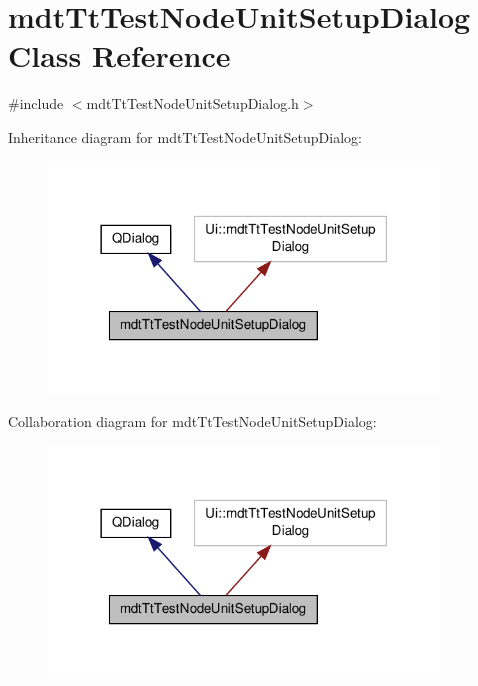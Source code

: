 \hypertarget{classmdt_tt_test_node_unit_setup_dialog}{\section{mdt\-Tt\-Test\-Node\-Unit\-Setup\-Dialog Class Reference}
\label{classmdt_tt_test_node_unit_setup_dialog}
}


{\ttfamily \#include $<$mdt\-Tt\-Test\-Node\-Unit\-Setup\-Dialog.\-h$>$}



Inheritance diagram for mdt\-Tt\-Test\-Node\-Unit\-Setup\-Dialog\-:\nopagebreak
\begin{figure}[H]
\begin{center}
\leavevmode
\includegraphics[width=294pt]{classmdt_tt_test_node_unit_setup_dialog__inherit__graph}
\end{center}
\end{figure}


Collaboration diagram for mdt\-Tt\-Test\-Node\-Unit\-Setup\-Dialog\-:\nopagebreak
\begin{figure}[H]
\begin{center}
\leavevmode
\includegraphics[width=294pt]{classmdt_tt_test_node_unit_setup_dialog__coll__graph}
\end{center}
\end{figure}
